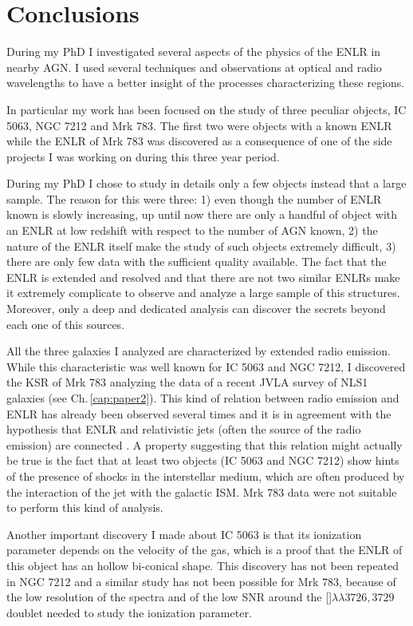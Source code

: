 \documentclass[../main.tex]{subfiles}
\begin{document}
\chapter{Conclusions}
\label{cap:conclusions}


During my PhD I investigated several aspects of the physics of the ENLR in nearby AGN.
I used several techniques and observations at optical and radio wavelengths to have a better insight of the processes characterizing these regions.

In particular my work has been focused on the study of three peculiar objects, IC 5063, NGC 7212 and Mrk 783.
The first two were objects with a known ENLR while the ENLR of Mrk 783 was discovered as a consequence of one of the side projects I was working on during this three year period.

During my PhD I chose to study in details only a few objects instead that a large sample.
The reason for this were three: 1) even though the number of ENLR known is slowly increasing, up until now there are only a handful of object with an ENLR at low redshift with respect to the number of AGN known, 2) the nature of the ENLR itself make the study of such objects extremely difficult, 3) there are only few data with the sufficient quality available.
The fact that the ENLR is extended and resolved and that there are not two similar ENLRs make it extremely complicate to observe and analyze a large sample of this structures.
Moreover, only a deep and dedicated analysis can discover the secrets beyond each one of this sources.

All the three galaxies I analyzed are characterized by extended radio emission.
While this characteristic was well known for IC 5063 and NGC 7212, I discovered the KSR of Mrk 783 analyzing the data of a recent JVLA survey of NLS1 galaxies (see Ch.\,\ref{cap:paper2}).
This kind of relation between radio emission and ENLR has already been observed several times \citep[e.g.][]{Wilson94,Schmitt03, Schmitt03b} and it is in agreement with the hypothesis that ENLR and relativistic jets (often the source of the radio emission) are connected \citep{Wilson94}.
A property suggesting that this relation might actually be true is the fact that at least two objects (IC 5063 and NGC 7212) show hints of the presence of shocks in the interstellar medium, which are often produced by the interaction of the jet with the galactic ISM.
Mrk 783 data were not suitable to perform this kind of analysis.

Another important discovery I made about IC 5063 is that its ionization parameter depends on the velocity of the gas, which is a proof that the ENLR of this object has an hollow bi-conical shape.
This discovery has not been repeated in NGC 7212 and a similar study has not been possible for Mrk 783, because of the low resolution of the spectra and of the low SNR around the []$\lambda\lambda3726,3729$ doublet needed to study the ionization parameter.
\end{document}
